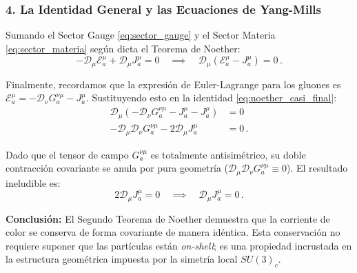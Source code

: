 \subsubsection*{4. La Identidad General y las Ecuaciones de Yang-Mills}
Sumando el Sector Gauge \eqref{eq:sector_gauge} y el Sector Materia \eqref{eq:sector_materia} según dicta el Teorema de Noether:
\begin{equation}
    - \mathcal{D}_\mu \mathcal{E}_{a}^\mu + \mathcal{D}_\mu J^\mu_a = 0 \quad \implies \quad \mathcal{D}_\mu (\mathcal{E}_{a}^\mu - J^\mu_a) = 0 \, .
    \label{eq:noether_casi_final}
\end{equation}

Finalmente, recordamos que la expresión de Euler-Lagrange para los gluones es $\mathcal{E}_a^\mu = -\mathcal{D}_\nu G^{\nu\mu}_a - J^\mu_a$. Sustituyendo esto en la identidad \eqref{eq:noether_casi_final}:
\begin{align}
    \mathcal{D}_\mu \left( -\mathcal{D}_\nu G^{\nu\mu}_a - J^\mu_a - J^\mu_a \right) &= 0 \nonumber \\
    - \mathcal{D}_\mu \mathcal{D}_\nu G^{\nu\mu}_a - 2 \mathcal{D}_\mu J^\mu_a &= 0 \, .
\end{align}

Dado que el tensor de campo $G^{\nu\mu}_a$ es totalmente antisimétrico, su doble contracción covariante se anula por pura geometría ($\mathcal{D}_\mu \mathcal{D}_\nu G^{\nu\mu}_a \equiv 0$). El resultado ineludible es:
\begin{equation}
    2 \mathcal{D}_\mu J^\mu_a = 0 \quad \implies \quad \mathcal{D}_\mu J^\mu_a = 0 \, .
\end{equation}

\textbf{Conclusión:} El Segundo Teorema de Noether demuestra que la corriente de color se conserva de forma covariante de manera idéntica. Esta conservación no requiere suponer que las partículas están \textit{on-shell}; es una propiedad incrustada en la estructura geométrica impuesta por la simetría local $SU(3)_c$.

